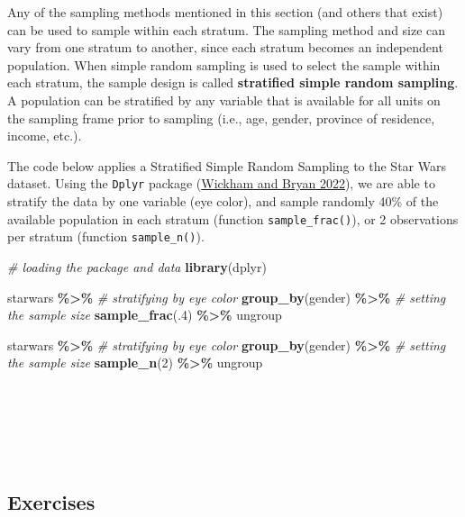 \documentclass[
]{article}
\newenvironment{Shaded}{\begin{snugshade}}{\end{snugshade}}
\newcommand{\CommentTok}[1]{\textcolor[rgb]{0.56,0.35,0.01}{\textit{#1}}}
\newcommand{\DecValTok}[1]{\textcolor[rgb]{0.00,0.00,0.81}{#1}}
\newcommand{\FunctionTok}[1]{\textcolor[rgb]{0.13,0.29,0.53}{\textbf{#1}}}
\newcommand{\NormalTok}[1]{#1}
\newcommand{\SpecialCharTok}[1]{\textcolor[rgb]{0.81,0.36,0.00}{\textbf{#1}}}
\begin{document}
Any of the sampling methods mentioned in this section (and others that
exist) can be used to sample within each stratum. The sampling method
and size can vary from one stratum to another, since each stratum
becomes an independent population. When simple random sampling is used
to select the sample within each stratum, the sample design is called
\textbf{stratified simple random sampling}. A population can be stratified by
any variable that is available for all units on the sampling frame prior
to sampling (i.e., age, gender, province of residence, income, etc.).

The code below applies a Stratified Simple Random Sampling to the Star
Wars dataset. Using the \texttt{Dplyr} package (\protect\hyperlink{ref-wickham2022}{Wickham and Bryan 2022}), we are able to
stratify the data by one variable (eye color), and sample randomly 40\%
of the available population in each stratum (function \texttt{sample\_frac()}),
or 2 observations per stratum (function \texttt{sample\_n()}).

\begin{Shaded}
\begin{Highlighting}[]
\CommentTok{\# loading the package and data}
\FunctionTok{library}\NormalTok{(dplyr)}

\NormalTok{starwars }\SpecialCharTok{\%\textgreater{}\%}
        \CommentTok{\# stratifying by eye color}
        \FunctionTok{group\_by}\NormalTok{(gender) }\SpecialCharTok{\%\textgreater{}\%}
        \CommentTok{\# setting the sample size}
        \FunctionTok{sample\_frac}\NormalTok{(.}\DecValTok{4}\NormalTok{) }\SpecialCharTok{\%\textgreater{}\%}
\NormalTok{        ungroup}

\NormalTok{starwars }\SpecialCharTok{\%\textgreater{}\%}
        \CommentTok{\# stratifying by eye color}
        \FunctionTok{group\_by}\NormalTok{(gender) }\SpecialCharTok{\%\textgreater{}\%}
        \CommentTok{\# setting the sample size}
        \FunctionTok{sample\_n}\NormalTok{(}\DecValTok{2}\NormalTok{) }\SpecialCharTok{\%\textgreater{}\%}
\NormalTok{        ungroup}
\end{Highlighting}
\end{Shaded}

~

~

~

\hypertarget{exercises-2}{%
\subsection{Exercises}\label{exercises-2}}
\end{document}
